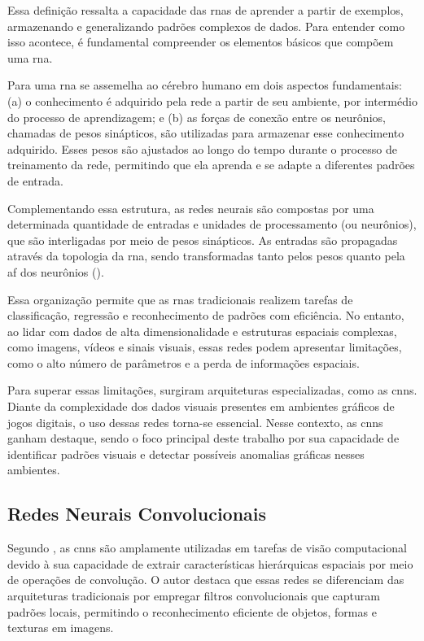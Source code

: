 Essa definição ressalta a capacidade das \glspl{rna} de aprender a partir de exemplos, armazenando e generalizando padrões complexos de dados. Para entender como isso acontece, é fundamental compreender os elementos básicos que compõem uma \gls{rna}.

Para  uma \gls{rna} se assemelha ao cérebro humano em dois aspectos fundamentais: (a) o conhecimento é adquirido pela rede a partir de seu ambiente, por intermédio do processo de aprendizagem; e (b) as forças de conexão entre os neurônios, chamadas de pesos sinápticos, são utilizadas para armazenar esse conhecimento adquirido. Esses pesos são ajustados ao longo do tempo durante o processo de treinamento da rede, permitindo que ela aprenda e se adapte a diferentes padrões de entrada.

Complementando essa estrutura, as redes neurais são compostas por uma determinada quantidade de entradas e unidades de processamento (ou neurônios), que são interligadas por meio de pesos sinápticos. As entradas são propagadas através da topologia da \gls{rna}, sendo transformadas tanto pelos pesos quanto pela \gls{af} dos neurônios ().

Essa organização permite que as \glspl{rna} tradicionais realizem tarefas de classificação, regressão e reconhecimento de padrões com eficiência. No entanto, ao lidar com dados de alta dimensionalidade e estruturas espaciais complexas, como imagens, vídeos e sinais visuais, essas redes podem apresentar limitações, como o alto número de parâmetros e a perda de informações espaciais.

Para superar essas limitações, surgiram arquiteturas especializadas, como as \glspl{cnn}. Diante da complexidade dos dados visuais presentes em ambientes gráficos de jogos digitais, o uso dessas redes torna-se essencial. Nesse contexto, as \glspl{cnn} ganham destaque, sendo o foco principal deste trabalho por sua capacidade de identificar padrões visuais e detectar possíveis anomalias gráficas nesses ambientes.

\subsection{Redes Neurais Convolucionais}

Segundo , as \glspl{cnn} são amplamente utilizadas em tarefas de visão computacional devido à sua capacidade de extrair características hierárquicas espaciais por meio de operações de convolução. O autor destaca que essas redes se diferenciam das arquiteturas tradicionais por empregar filtros convolucionais que capturam padrões locais, permitindo o reconhecimento eficiente de objetos, formas e texturas em imagens.

